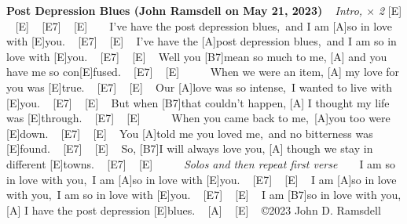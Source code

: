 \documentclass[12pt]{article}
\begin{document}
\begin{guitar}
  \textbf{Post Depression Blues (John Ramsdell on May 21, 2023)}
  ~
  \emph{Intro, $\times$ 2}
  [E] ~ [E] ~ [E7] ~ [E] ~
  ~
  I've have the post depression blues,\
  and I am [A]so in love with [E]you. ~ [E7] ~ [E] ~
  I've have the [A]post depression blues,\
  and I am so in love with [E]you. ~ [E7] ~ [E] ~
  Well you [B7]mean so much to me, [A]
  and you have me so con[E]fused. ~ [E7] ~ [E] ~
  ~
  ~
  When we were an item, [A]
  my love for you was [E]true. ~ [E7] ~ [E] ~
  Our [A]love was so intense,\
  I wanted to live with [E]you. ~ [E7] ~ [E] ~
  But when [B7]that couldn't happen, [A]
  I thought my life was [E]through. ~ [E7] ~ [E] ~
  ~
  ~
  When you came back to me,\
  [A]you too were [E]down. ~ [E7] ~ [E] ~
  You [A]told me you loved me,\
  and no bitterness was [E]found. ~ [E7] ~ [E] ~
  So, [B7]I will always love you, [A]
  though we stay in different [E]towns. ~ [E7] ~ [E] ~
  ~
  ~
  \emph{Solos and then repeat first verse}
  ~
  ~
  I am so in love with you,\
  I am [A]so in love with [E]you. ~ [E7] ~ [E] ~
  I am [A]so in love with you,\
  I am so in love with [E]you. ~ [E7] ~ [E] ~
  I am [B7]so in love with you, [A]
  I have the post depression [E]blues. ~ [A] ~ [E] ~
  \vfill
  \copyright 2023 John D. Ramsdell
\end{guitar}
\end{document}
